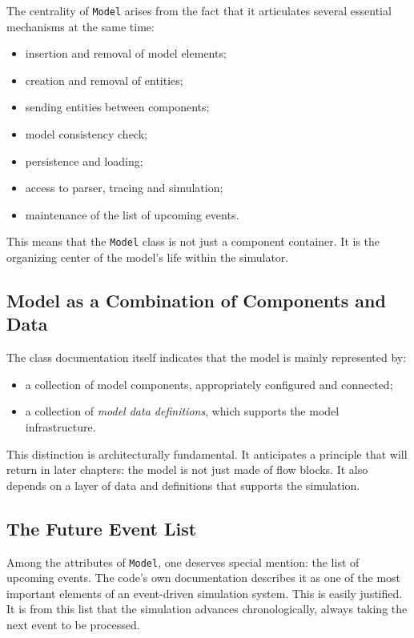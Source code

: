 The centrality of \texttt{Model} arises from the fact that it articulates several essential mechanisms at the same time:
\begin{itemize}
 \item insertion and removal of model elements;
 \item creation and removal of entities;
 \item sending entities between components;
 \item model consistency check;
 \item persistence and loading;
 \item access to parser, tracing and simulation;
 \item maintenance of the list of upcoming events.
\end{itemize}

This means that the \texttt{Model} class is not just a component container. It is the organizing center of the model's life within the simulator.

\subsection{Model as a Combination of Components and Data}
\label{subsec:cap7_modelo_componentes_dados}

The class documentation itself indicates that the model is mainly represented by:
\begin{itemize}
 \item a collection of model components, appropriately configured and connected;
 \item a collection of \textit{model data definitions}, which supports the model infrastructure.
\end{itemize}

This distinction is architecturally fundamental. It anticipates a principle that will return in later chapters: the model is not just made of flow blocks. It also depends on a layer of data and definitions that supports the simulation.

\subsection{The Future Event List}
\label{subsec:cap7_lista_eventos_futuros}

Among the attributes of \texttt{Model}, one deserves special mention: the list of upcoming events. The code's own documentation describes it as one of the most important elements of an event-driven simulation system. This is easily justified. It is from this list that the simulation advances chronologically, always taking the next event to be processed.

